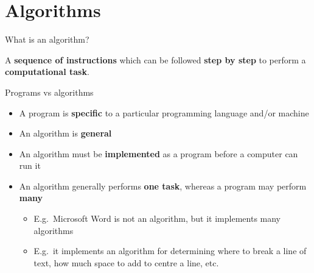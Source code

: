 \part{Algorithms}
\frame{\partpage}

\begin{frame}{What is an algorithm?}
	\pause\begin{center}
		A \textbf{sequence of instructions} which can be followed \textbf{step by step}
		to perform a \textbf{computational task}.
	\end{center}
\end{frame}

\begin{frame}{Programs vs algorithms}
	\begin{itemize}
		\pause\item A program is \textbf{specific} to a particular programming language and/or machine
		\pause\item An algorithm is \textbf{general}
		\pause\item An algorithm must be \textbf{implemented} as a program before a computer can run it
		\pause\item An algorithm generally performs \textbf{one task}, whereas a program may perform \textbf{many}
		\begin{itemize}
			\pause\item E.g.\ Microsoft Word is not an algorithm, but it implements many algorithms
			\pause\item E.g.\ it implements an algorithm for determining where to break a line of text,
				how much space to add to centre a line, etc.
		\end{itemize}
	\end{itemize}
\end{frame}


